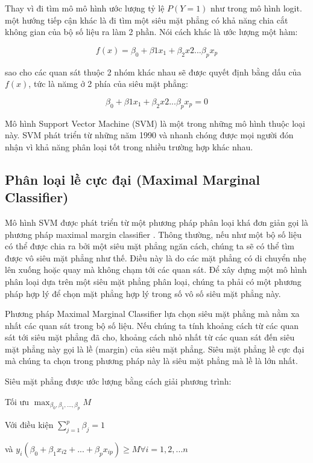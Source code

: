 Thay vì đi tìm mô mô hình ước lượng tỷ lệ $P(Y =1)$ như trong mô hình logit. một hướng tiếp cận khác là đi tìm một siêu mặt phẳng có khả năng chia cắt không gian của bộ số liệu ra làm 2 phần. Nói cách khác là ước lượng một hàm:

$$
f(x) = \beta_0 + \beta1 x_1 + \beta_2 x2 ...\beta_p x_p
$$

sao cho các quan sát thuộc 2 nhóm khác nhau sẽ được quyết định bằng dấu của $f(x)$, tức là nămg ở 2 phía của siêu mặt phẳng:

$$
\beta_0 + \beta1 x_1 + \beta_2 x2 ...\beta_p x_p = 0
$$

Mô hình Support Vector Machine (SVM) là một trong những mô hình thuộc loại này. SVM phát triển từ những năm 1990 và nhanh chóng được mọi người đón nhận vì khả năng phân loại tốt trong nhiều trường hợp khác nhau.

\subsection{Phân loại lề cực đại (Maximal Marginal Classifier)}
Mô hình SVM được phát triển từ một phương pháp phân loại khá đơn giản gọi là phương pháp maximal margin classifier \parencite{boser1992training}. Thông thường, nếu như một bộ số liệu có thể được chia ra bởi một siêu mặt phẳng ngăn cách, chúng ta sẽ có thể tìm được vô siêu mặt phẳng như thế. Điều này là do các mặt phẳng có di chuyển nhẹ lên xuống hoặc quay mà không chạm tới các quan sát. Để xây dựng một mô hình phân loại dựa trên một siêu mặt phẳng phân loại,  chúng ta phải có một phương pháp hợp lý để chọn mặt phẳng hợp lý trong số vô số siêu mặt phẳng này.

Phương pháp Maximal Marginal Classifier lựa chọn siêu mặt phẳng mà nằm xa nhất các quan sát trong bộ số liệu. Nếu chúng ta tính khoảng cách từ các quan sát tới siêu mặt phẳng đã cho, khoảng cách nhỏ nhất từ các quan sát đến siêu mặt phẳng này gọi là lề (margin) của siêu mặt phẳng. Siêu mặt phẳng lề cực đại mà chúng ta chọn trong phương pháp này là siêu mặt phẳng mà lề là lớn nhất.


Siêu mặt phẳng được ước lượng bằng cách giải phương trình:

Tối ưu $\max_{\beta_0, \beta_1,...,\beta_p}M$ 

Với điều kiện $\sum_{j = 1}^p \beta_j = 1$

và $y_i(\beta_0 + \beta_1x_{i2} + ... + \beta_px_{ip}) \geq M \forall i = 1, 2, ...n$


